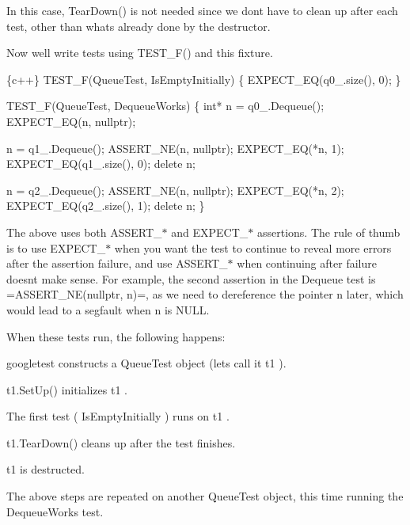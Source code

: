 In this case, {\ttfamily Tear\+Down()} is not needed since we don\textquotesingle{}t have to clean up after each test, other than what\textquotesingle{}s already done by the destructor.

Now we\textquotesingle{}ll write tests using {\ttfamily T\+E\+S\+T\+\_\+\+F()} and this fixture.


\begin{DoxyCode}
\{c++\}
TEST\_F(QueueTest, IsEmptyInitially) \{
  EXPECT\_EQ(q0\_.size(), 0);
\}

TEST\_F(QueueTest, DequeueWorks) \{
  int* n = q0\_.Dequeue();
  EXPECT\_EQ(n, nullptr);

  n = q1\_.Dequeue();
  ASSERT\_NE(n, nullptr);
  EXPECT\_EQ(*n, 1);
  EXPECT\_EQ(q1\_.size(), 0);
  delete n;

  n = q2\_.Dequeue();
  ASSERT\_NE(n, nullptr);
  EXPECT\_EQ(*n, 2);
  EXPECT\_EQ(q2\_.size(), 1);
  delete n;
\}
\end{DoxyCode}


The above uses both {\ttfamily A\+S\+S\+E\+R\+T\+\_\+$\ast$} and {\ttfamily E\+X\+P\+E\+C\+T\+\_\+$\ast$} assertions. The rule of thumb is to use {\ttfamily E\+X\+P\+E\+C\+T\+\_\+$\ast$} when you want the test to continue to reveal more errors after the assertion failure, and use {\ttfamily A\+S\+S\+E\+R\+T\+\_\+$\ast$} when continuing after failure doesn\textquotesingle{}t make sense. For example, the second assertion in the {\ttfamily Dequeue} test is =A\+S\+S\+E\+R\+T\+\_\+\+N\+E(nullptr, n)=, as we need to dereference the pointer {\ttfamily n} later, which would lead to a segfault when {\ttfamily n} is {\ttfamily N\+U\+LL}.

When these tests run, the following happens\+:


\begin{DoxyEnumerate}
\item googletest constructs a {\ttfamily Queue\+Test} object (let\textquotesingle{}s call it {\ttfamily t1} ).
\end{DoxyEnumerate}
\begin{DoxyEnumerate}
\item {\ttfamily t1.\+Set\+Up()} initializes {\ttfamily t1} .
\end{DoxyEnumerate}
\begin{DoxyEnumerate}
\item The first test ( {\ttfamily Is\+Empty\+Initially} ) runs on {\ttfamily t1} .
\end{DoxyEnumerate}
\begin{DoxyEnumerate}
\item {\ttfamily t1.\+Tear\+Down()} cleans up after the test finishes.
\end{DoxyEnumerate}
\begin{DoxyEnumerate}
\item {\ttfamily t1} is destructed.
\end{DoxyEnumerate}
\begin{DoxyEnumerate}
\item The above steps are repeated on another {\ttfamily Queue\+Test} object, this time running the {\ttfamily Dequeue\+Works} test.
\end{DoxyEnumerate}

